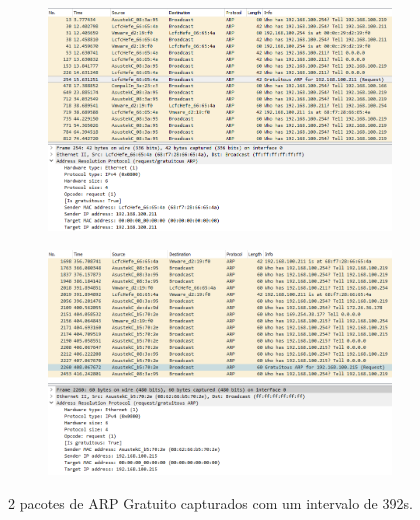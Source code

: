 \documentclass{llncs}
\begin{document}
\begin{figure}[h]
  \centering
  \begin{subfigure}{0.5\textwidth}
    \centering
    \includegraphics[width=1\linewidth]{./imagens/ARPG1_1.png}
  \end{subfigure}%
  \begin{subfigure}{0.5\textwidth}
    \centering
    \includegraphics[width=1\linewidth]{./imagens/ARPG1_2.png}
  \end{subfigure}%
  \caption{2 pacotes de ARP Gratuito capturados com um intervalo de 392s.}
  \label{fig:arpg_1}
\end{figure}
\end{document}
